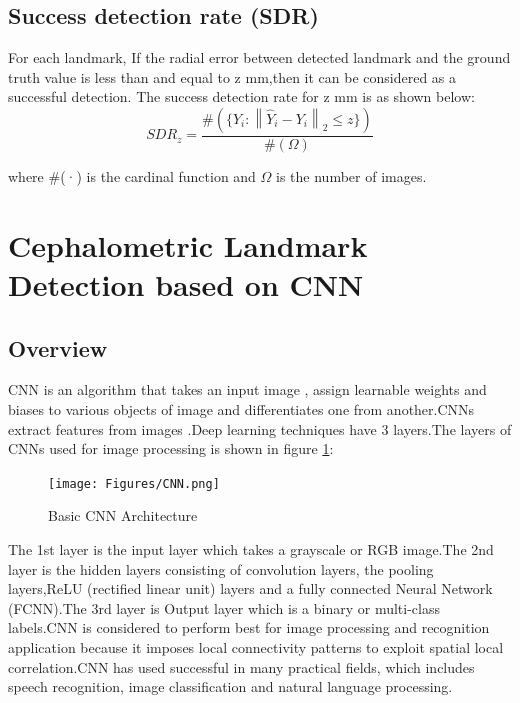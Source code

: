 \documentclass[sn-mathphys]{sn-jnl}%
\theoremstyle{thmstyleone}%
\theoremstyle{thmstyletwo}%
\theoremstyle{thmstylethree}%
\begin{document}
\subsection{Success detection rate (SDR)} For each landmark, If the radial error between detected landmark and the ground truth value is less than and equal to z mm,then it can be considered as a successful detection. The success detection rate for z mm is as shown below:
\begin{equation}
    SDR_z = \frac{ \#(\{{\hat{Y}_i}:\left \| \hat{Y}_i - Y_i \right \|_{2} \leqslant z\})} {\#(\Omega)}
\end{equation}

where \#(·) is the cardinal function and \begin{math} \Omega \end{math} is the number of images.


\section{Cephalometric Landmark Detection based on CNN}\label{single_stage_CNN}
\subsection{Overview}
CNN is an algorithm that takes an input image , assign learnable  weights and biases to various objects of image and differentiates one from another.CNNs extract features from images .Deep learning techniques have 3 layers.The layers of CNNs used for image processing  is shown in figure \ref{figure 4.1:CNN}:

\begin{figure}[htp]
    \centering
    \texttt{[image: Figures/CNN.png]}
    \caption{Basic CNN Architecture}
    \label{figure 4.1:CNN}
\end{figure} 

The 1st layer is the input layer which takes a grayscale or RGB image.The 2nd layer is the hidden layers consisting of convolution layers, the pooling layers,ReLU (rectified linear unit) layers and a fully connected Neural Network (FCNN).The 3rd layer is Output layer which is a binary or multi-class labels.CNN is considered to perform best for image processing and recognition application because it imposes local connectivity patterns to exploit spatial local correlation.CNN has used successful in many practical fields, which includes speech
recognition, image classification and natural language processing.
\end{document}
